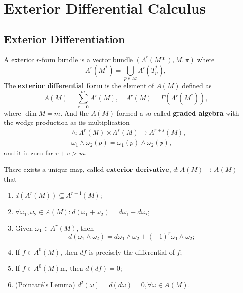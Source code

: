 \section{Exterior Differential Calculus}

\subsection{Exterior Differentiation}
\begin{definition}
A exterior $r$-form bundle is a vector bundle $(\Lambda^r(M*), M,\pi)$ where 
\begin{equation}
\Lambda^r(M^*) = \bigcup_{p\in M}\Lambda^r(T^*_p),
\end{equation}
The \textbf{exterior differential form} is the element of $A(M)$ defined as 
\begin{equation}
A(M)=\sum_{r=0}^mA^r(M),\quad A^r(M)=\Gamma(\Lambda^r(M^*)),
\end{equation}
where $\dim M=m$. And the $A(M)$ formed a so-called \textbf{graded algebra} with the wedge production as its multiplication
\begin{equation}
\begin{aligned}
&\wedge:A^r(M)\times A^s(M)\to A^{r+s}(M),\\
&\omega_1\wedge\omega_2(p)=\omega_1(p)\wedge\omega_2(p),
\end{aligned}
\end{equation}
and it is zero for $r+s>m$.
\end{definition}

\begin{theorem}
There exists a unique map, called \textbf{exterior derivative}, $d:A(M)\to A(M)$ that
\begin{enumerate}
\item $d(A^r(M))\subseteq A^{r+1}(M)$;
\item $\forall\omega_1,\omega_2\in A(M):d(\omega_1+\omega_2)=d\omega_1+d\omega_2$;
\item Given $\omega_1\in A^r(M)$, then
\begin{equation}
d(\omega_1\wedge\omega_2)=d\omega_1\wedge\omega_2+(-1)^r\omega_1\wedge\omega_2;
\end{equation}
\item If $f\in A^0(M)$, then $df$ is precisely the differential of $f$;
\item If $f\in A^0(M)$m, then $d(df)=0$;
\item (Poincar\'e's Lemma) $d^2(\omega)=d(d\omega)=0,\forall \omega\in A(M)$.
\end{enumerate}
\end{theorem}

